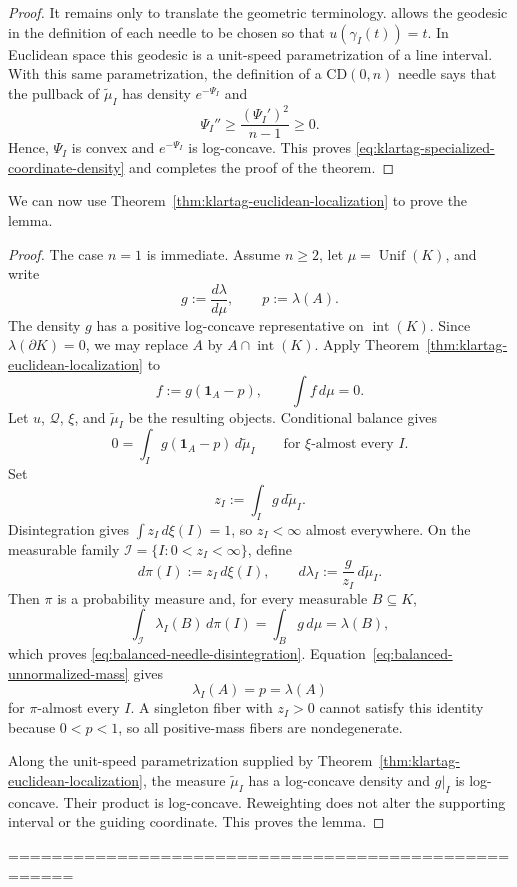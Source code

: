 \documentclass[11pt]{article}
\theoremstyle{definition}
\theoremstyle{remark}
\newcommand{\one}{\mathbf 1}
\newcommand{\Unif}{\operatorname{Unif}}
\begin{document}
\begin{proof}
It remains only to translate the geometric terminology.  \cite[Theorem~1.4~\textup{(iii)}]{KlartagNeedles} allows the geodesic in the definition of each
needle to be chosen so that $u(\gamma_I(t))=t$.  In Euclidean space this
geodesic is a unit-speed parametrization of a line interval.  With this same
parametrization, the definition of a $\mathrm{CD}(0,n)$ needle says that the
pullback of $\widetilde\mu_I$ has density $e^{-\Psi_I}$ and
\[
 \Psi_I''\ge\frac{(\Psi_I')^2}{n-1}\ge0.
\]
Hence, $\Psi_I$ is convex and $e^{-\Psi_I}$ is log-concave.  This proves
\eqref{eq:klartag-specialized-coordinate-density} and completes the proof of the theorem.
\end{proof}

We can now use Theorem~\ref{thm:klartag-euclidean-localization} to prove the lemma. 

\lemklartag*
\begin{proof}
The case $n=1$ is immediate.  Assume $n\ge2$, let $\mu=\Unif(K)$, and write
\[
 g:=\frac{d\lambda}{d\mu},
 \qquad
 p:=\lambda(A).
\]
The density $g$ has a positive log-concave representative on $\operatorname{int}(K)$.  Since $\lambda(\partial K)=0$, we may replace $A$ by $A\cap\operatorname{int}(K)$.  Apply Theorem~\ref{thm:klartag-euclidean-localization} to
\[
 f:=g(\one_A-p),
 \qquad
 \int f\,d\mu=0.
\]
Let $u$, $\mathcal Q$, $\xi$, and $\widetilde\mu_I$ be the resulting objects.  Conditional balance gives
\begin{equation}\label{eq:balanced-unnormalized-mass}
 0=\int_Ig(\one_A-p)\,d\widetilde\mu_I
 \qquad\text{for $\xi$-almost every }I.
\end{equation}
Set
\[
 z_I:=\int_Ig\,d\widetilde\mu_I.
\]
Disintegration gives $\int z_I\,d\xi(I)=1$, so $z_I<\infty$ almost everywhere.  On the measurable family $\mathcal I=\{I:0<z_I<\infty\}$, define
\[
 d\pi(I):=z_I\,d\xi(I),
 \qquad
 d\lambda_I:=\frac{g}{z_I}\,d\widetilde\mu_I.
\]
Then $\pi$ is a probability measure and, for every measurable $B\subseteq K$,
\[
 \int_{\mathcal I}\lambda_I(B)\,d\pi(I)
 =\int_Bg\,d\mu
 =\lambda(B),
\]
which proves \eqref{eq:balanced-needle-disintegration}.  Equation~\eqref{eq:balanced-unnormalized-mass} gives
\[
 \lambda_I(A)=p=\lambda(A)
\]
for $\pi$-almost every $I$.  A singleton fiber with $z_I>0$ cannot satisfy this identity because $0<p<1$, so all positive-mass fibers are nondegenerate.

Along the unit-speed parametrization supplied by Theorem~\ref{thm:klartag-euclidean-localization}, the measure $\widetilde\mu_I$ has a log-concave density and $g|_I$ is log-concave.  Their product is log-concave.  Reweighting does not alter the supporting interval or the guiding coordinate.  This proves the lemma.
\end{proof}
\iffalse
====================================================
\end{document}

